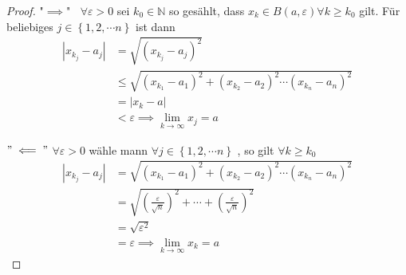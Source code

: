 \documentclass[11.5 pt, a4paper]{memoir}
\begin{document}
\begin{proof}
	"$ \implies $" $\;\; \forall \varepsilon >0  $ sei $ k_0 \in \mathbb{N} $ so gesählt, dass $ x_{k} \in B(a, \varepsilon) \forall k \geq k_0$
	gilt. Für beliebiges $ j \in \left\{ 1, 2, \cdots n \right\}  $ ist dann
	\begin{align*}
		\left| x_{k_{j}} - a_{j} \right| &= \sqrt{\left( x_{k_{j}} - a_{j} \right)^2}\\ 
		& \leq	\sqrt{ \left(  x_{k_{1}} - a _{1} \right)^2 +  \left(  x_{k_{2}} - a _{2}\right)^2 \cdots \left(  x_{k_{n}} - a _{n}\right)^2} \\ 
		& = \left| x_{k} -a \right| \\
		 & < \varepsilon \implies \lim_{ k \to \infty} x_{j} = a  
	\end{align*}
	
$"\impliedby"$ $ \forall \varepsilon > 0 $ wähle mann $ \forall j \in \left\{  1,2, \cdots n \right\}$ , so gilt $ \forall k \geq k_0$
\begin{align*}
	 \left| x_{k_{j}} - a_{j} \right| &= \sqrt{ \left(  x_{k_{1}} - a _{1} \right)^2 +  \left(  x_{k_{2}} - a _{2}\right)^2 \cdots 
\left(  x_{k_{n}} - a _{n}\right)^2} \\
&= \sqrt{\left( \frac{ \varepsilon}{\sqrt{n}} \right)^2 + \cdots +  \left( \frac{ \varepsilon}{\sqrt{n}} \right)^2}\\
& = \sqrt{ \varepsilon^2}\\
&= \varepsilon \implies \lim_{k \to \infty} x_{k} = a  
\end{align*}

 
\end{proof}
	
\end{document}
